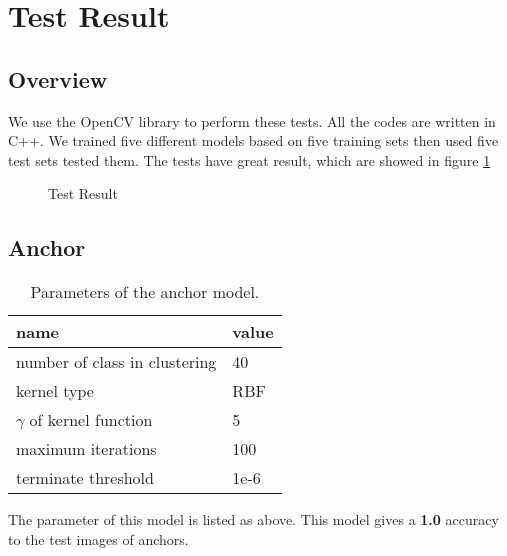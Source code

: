 \section{Test Result}

\subsection{Overview}
We use the OpenCV library to perform these tests. All the codes are written in C++.
We trained five different models based on five training sets then used five test sets tested them. The tests have great result, which are showed in figure \ref{fig:res:1}

\begin{figure}[H]
\centering

\caption{Test Result}
\label{fig:res:1}
\end{figure}


\subsection{Anchor}

\begin{table}[H]
\centering

\begin{tabular}{|l|l|}
\hline
\textbf{name}                 & \textbf{value} \\ \hline
number of class in clustering & 40             \\ \hline
kernel type                   & RBF            \\ \hline
$\gamma$ of kernel function   & 5              \\ \hline
maximum iterations            & 100            \\ \hline
terminate threshold           & 1e-6           \\ \hline
\end{tabular}
\caption{Parameters of the anchor model.}
\end{table}

The parameter of this model is listed as above.
This model gives a \textbf{1.0} accuracy to the test images of anchors.



